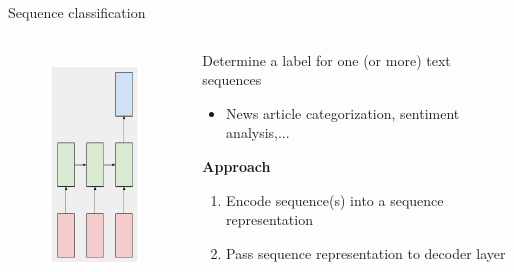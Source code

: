 \documentclass[12pt,aspectratio=169,handout]{beamer}
\begin{document}
\begin{frame}{Sequence classification}
	\begin{columns}[T] %
		\begin{column}{.3\textwidth}
			
			\begin{figure}[h]
				\includegraphics[height=6cm]{sequence_classification.pdf}
			\end{figure}
			
		\end{column}
		\begin{column}{.7\textwidth}
			\vspace{1cm}
			Determine a label for one (or more) text sequences
			\begin{itemize}
				\item News article categorization, sentiment analysis,... 
			\end{itemize}
			\pause
			\textbf{Approach}
			\begin{enumerate}
				\item Encode sequence(s) into a sequence representation
				\item Pass sequence representation to decoder layer
			\end{enumerate}
		\end{column}
	\end{columns}
	
\end{frame}
\end{document}
